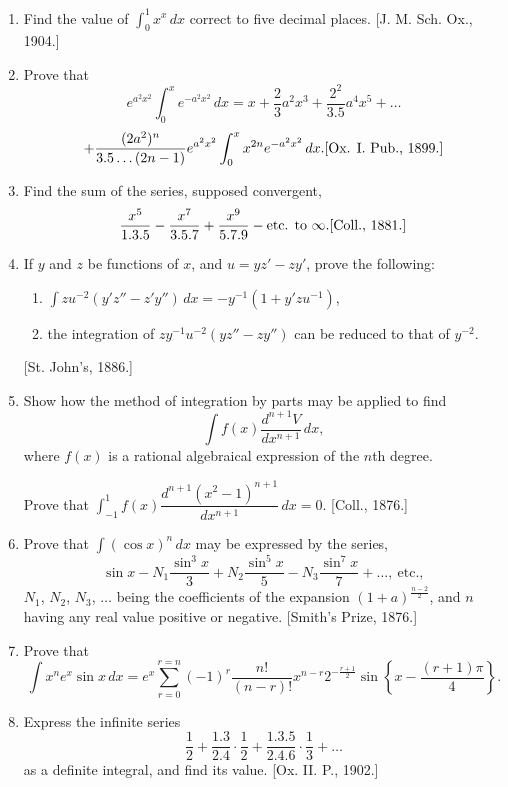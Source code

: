 \documentclass[11pt, a4paper]{article}
\newcommand{\source}[1]{\hfill\textnormal{[#1]}}
\begin{document}
\begin{enumerate}[leftmargin=2em]
\item Find the value of $\displaystyle\int_0^1 x^x\,dx$ correct to five decimal places. \source{J. M. Sch. Ox., 1904.}

\item Prove that
\[
e^{a^2x^2}\int_0^x e^{-a^2x^2}\,dx = x+\dfrac{2}{3}a^2x^3+\dfrac{2^2}{3.5}a^4x^5+\dots
\]
\[
+\dfrac{(2a^2)^n}{3.5\dots(2n-1)}e^{a^2x^2}\int_0^x x^{2n}e^{-a^2x^2}\,dx. \source{Ox. I. Pub., 1899.}
\]

\item Find the sum of the series, supposed convergent,
\[
\dfrac{x^5}{1.3.5}-\dfrac{x^7}{3.5.7}+\dfrac{x^9}{5.7.9}-\text{etc. to }\infty. \source{Coll., 1881.}
\]

\item If $y$ and $z$ be functions of $x$, and $u=yz'-zy'$, prove the following:
\begin{enumerate}[label=(\roman*)]
\item $\displaystyle\int zu^{-2}(y'z''-z'y'')\,dx = -y^{-1}(1+y'zu^{-1})$,
\item the integration of $zy^{-1}u^{-2}(yz''-zy'')$ can be reduced to that of $y^{-2}$.
\end{enumerate}
\source{St. John's, 1886.}

\item Show how the method of integration by parts may be applied to find
\[
\int f(x)\dfrac{d^{n+1}V}{dx^{n+1}}\,dx,
\]
where $f(x)$ is a rational algebraical expression of the $n$th degree.

Prove that $\displaystyle\int_{-1}^1 f(x)\dfrac{d^{n+1}(x^2-1)^{n+1}}{dx^{n+1}}\,dx = 0$. \source{Coll., 1876.}

\item Prove that $\displaystyle\int (\cos x)^n\,dx$ may be expressed by the series,
\[
\sin x - N_1\dfrac{\sin^3x}{3}+N_2\dfrac{\sin^5x}{5}-N_3\dfrac{\sin^7x}{7}+\dots,\ \text{etc.},
\]
$N_1$, $N_2$, $N_3$, $\dots$ being the coefficients of the expansion $(1+a)^{\frac{n-2}{2}}$, and $n$ having any real value positive or negative. \source{Smith's Prize, 1876.}

\item Prove that
\[
\int x^ne^x\sin x\,dx = e^x\sum_{r=0}^{r=n}(-1)^r\dfrac{n!}{(n-r)!}x^{n-r}2^{-\frac{r+1}{2}}\sin\left\{x-\dfrac{(r+1)\pi}{4}\right\}.
\]

\item Express the infinite series
\[
\dfrac{1}{2}+\dfrac{1.3}{2.4}\cdot\dfrac{1}{2}+\dfrac{1.3.5}{2.4.6}\cdot\dfrac{1}{3}+\dots
\]
as a definite integral, and find its value. \source{Ox. II. P., 1902.}


\end{enumerate}
\end{document}
